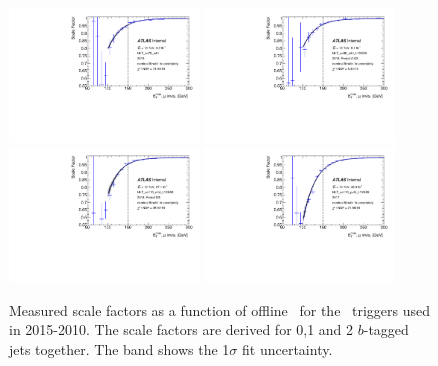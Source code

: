 \begin{figure}[tb!]
    \centering
    \includegraphics[width=0.45\textwidth]{chapters/c6/figures/METTriggerCalibration/SF_HLT_xe70_mht.pdf}
    \includegraphics[width=0.45\textwidth]{chapters/c6/figures/METTriggerCalibration/SF_HLT_xe90_mht_L1XE50.pdf}
    \includegraphics[width=0.45\textwidth]{chapters/c6/figures/METTriggerCalibration/SF_HLT_xe110_mht_L1XE50.pdf}
    \includegraphics[width=0.45\textwidth]{chapters/c6/figures/METTriggerCalibration/SF_HLT_xe110_pufit_L1XE55.pdf}
    \caption{Measured scale factors as a function of offline \METnomu~for the \MET~triggers used in 2015-2010. The scale factors are derived for 0,1 and 2 $b$-tagged jets together. The band shows the 1$\sigma$ fit uncertainty.}
    \label{fig:TrigSF}
\end{figure}

